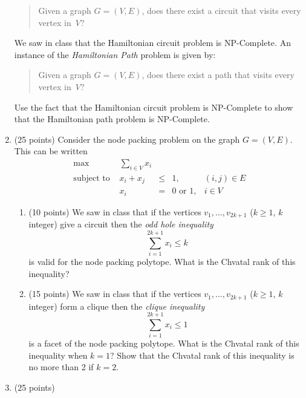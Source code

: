 \begin{enumerate}
    \begin{quote}
      Given a graph $G=(V,E)$, does there exist a circuit that visits
      every vertex in~$V$?
    \end{quote}
    We saw in class that the Hamiltonian circuit problem is NP-Complete.
    An instance of the {\em Hamiltonian Path} problem is given by:
    \begin{quote}
      Given a graph $G=(V,E)$, does there exist a path that visits
      every vertex in~$V$?
    \end{quote}
    Use the fact that the Hamiltonian circuit problem is NP-Complete
    to show that the Hamiltonian path problem is NP-Complete.
\pagebreak
  \item (25 points)
    Consider the node packing problem on the graph $G=(V,E)$.
    This can be written
    \begin{displaymath}
      \begin{array}{lrcll}
        \max & \sum_{i\in V} x_i \\
        \mbox{subject to } & x_i + x_j & \leq & 1, & (i,j) \in E \\
            & x_i & = & 0 \mbox{ or } 1, & i \in V
      \end{array}
    \end{displaymath}
    \begin{enumerate}
      \item (10 points)
        We saw in class that if the vertices $v_1,...,v_{2k+1}$
        ($k\geq 1$, $k$ integer)
        give a circuit then the {\em odd hole inequality}
        \begin{displaymath}
          \sum_{i=1}^{2k+1} x_i \leq k
        \end{displaymath}
        is valid for the node packing polytope.
        What is the Chvatal rank of this inequality?
      \item (15 points)
        We saw in class that if the vertices $v_1,...,v_{2k+1}$
        ($k\geq 1$, $k$ integer)
        form a clique then the {\em clique inequality}
        \begin{displaymath}
          \sum_{i=1}^{2k+1} x_i \leq 1
        \end{displaymath}
        is a facet of the node packing polytope.
        What is the Chvatal rank of this inequality when $k=1$?
        Show that the Chvatal rank of this inequality is no more than 2 if
        $k=2$.
    \end{enumerate}
  \item (25 points)

\end{enumerate}
